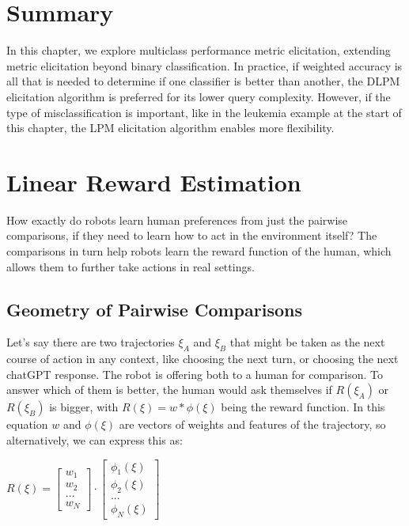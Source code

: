 \documentclass[
  letterpaper,
  numbers=noenddot,
  DIV=11,
  oneside]{scrreprt}
\theoremstyle{remark}
\begin{document}
\section{Summary}\label{summary}

In this chapter, we explore multiclass performance metric elicitation,
extending metric elicitation beyond binary classification. In practice,
if weighted accuracy is all that is needed to determine if one
classifier is better than another, the DLPM elicitation algorithm is
preferred for its lower query complexity. However, if the type of
misclassification is important, like in the leukemia example at the
start of this chapter, the LPM elicitation algorithm enables more
flexibility.

\section{Linear Reward Estimation}\label{linear-reward-estimation}

How exactly do robots learn human preferences from just the pairwise
comparisons, if they need to learn how to act in the environment itself?
The comparisons in turn help robots learn the reward function of the
human, which allows them to further take actions in real settings.

\subsection{Geometry of Pairwise
Comparisons}\label{geometry-of-pairwise-comparisons}

Let's say there are two trajectories \(\xi_A\) and \(\xi_B\) that might
be taken as the next course of action in any context, like choosing the
next turn, or choosing the next chatGPT response. The robot is offering
both to a human for comparison. To answer which of them is better, the
human would ask themselves if \(R(\xi_A)\) or \(R(\xi_B)\) is bigger,
with \(R(\xi) = w * \phi(\xi)\) being the reward function. In this
equation \(w\) and \(\phi(\xi)\) are vectors of weights and features of
the trajectory, so alternatively, we can express this as:

\(R(\xi) = \begin{bmatrix} w_1 \\ w_2 \\ ... \\ w_N \end{bmatrix} \cdot \begin{bmatrix} \phi_1(\xi) \\ \phi_2(\xi) \\ ... \\ \phi_N(\xi) \end{bmatrix}\)
\end{document}

